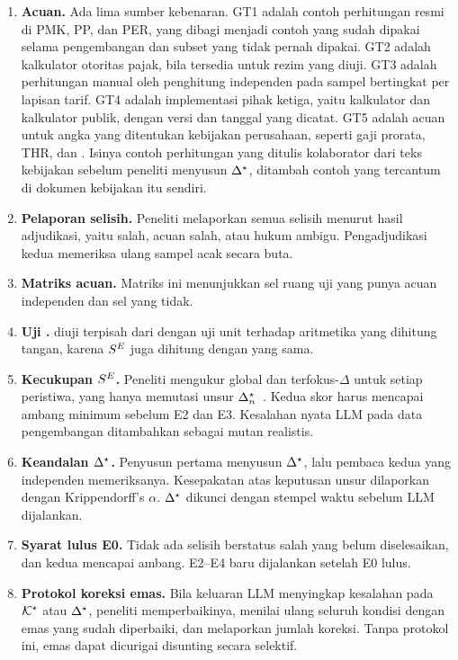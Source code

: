 \begin{enumerate}[leftmargin=*,nosep]
  \item \textbf{Acuan.} Ada lima sumber kebenaran. GT1 adalah contoh perhitungan resmi di PMK, PP, dan PER, yang dibagi menjadi contoh yang sudah dipakai selama pengembangan dan subset  yang tidak pernah dipakai. GT2 adalah kalkulator otoritas pajak, bila tersedia untuk rezim yang diuji. GT3 adalah perhitungan manual oleh penghitung independen pada sampel bertingkat per lapisan tarif. GT4 adalah implementasi pihak ketiga, yaitu kalkulator  dan kalkulator publik, dengan versi dan tanggal yang dicatat. GT5 adalah acuan untuk angka yang ditentukan kebijakan perusahaan, seperti gaji prorata, THR, dan . Isinya contoh perhitungan yang ditulis kolaborator dari teks kebijakan sebelum peneliti menyusun $\Delta^{\star}$, ditambah contoh yang tercantum di dokumen kebijakan itu sendiri.
  \item \textbf{Pelaporan selisih.} Peneliti melaporkan semua selisih menurut hasil adjudikasi, yaitu  salah, acuan salah, atau hukum ambigu. Pengadjudikasi kedua memeriksa ulang sampel acak secara buta.
  \item \textbf{Matriks acuan.} Matriks ini menunjukkan sel ruang uji yang punya acuan independen dan sel yang tidak.
  \item \textbf{Uji .}  diuji terpisah dari  dengan uji unit terhadap aritmetika yang dihitung tangan, karena $S^{E}$ juga dihitung dengan  yang sama.
  \item \textbf{Kecukupan $S^{E}$.} Peneliti mengukur  global dan  terfokus-$\Delta$ untuk setiap peristiwa, yang hanya memutasi unsur $\Delta^{\star}_n$~\cite{petrovic2021mutation,petrovic2022mutation}. Kedua skor harus mencapai ambang minimum sebelum E2 dan E3. Kesalahan nyata LLM pada data pengembangan ditambahkan sebagai mutan realistis.
  \item \textbf{Keandalan $\Delta^{\star}$.} Penyusun pertama menyusun $\Delta^{\star}$, lalu pembaca kedua yang independen memeriksanya. Kesepakatan atas keputusan unsur dilaporkan dengan Krippendorff's $\alpha$. $\Delta^{\star}$ dikunci dengan stempel waktu sebelum LLM dijalankan.
  \item \textbf{Syarat lulus E0.} Tidak ada selisih berstatus  salah yang belum diselesaikan, dan kedua  mencapai ambang. E2--E4 baru dijalankan setelah E0 lulus.
  \item \textbf{Protokol koreksi emas.} Bila keluaran LLM menyingkap kesalahan pada $\mathcal{K}^{\star}$ atau $\Delta^{\star}$, peneliti memperbaikinya, menilai ulang seluruh kondisi dengan emas yang sudah diperbaiki, dan melaporkan jumlah koreksi. Tanpa protokol ini, emas dapat dicurigai disunting secara selektif.
\end{enumerate}

